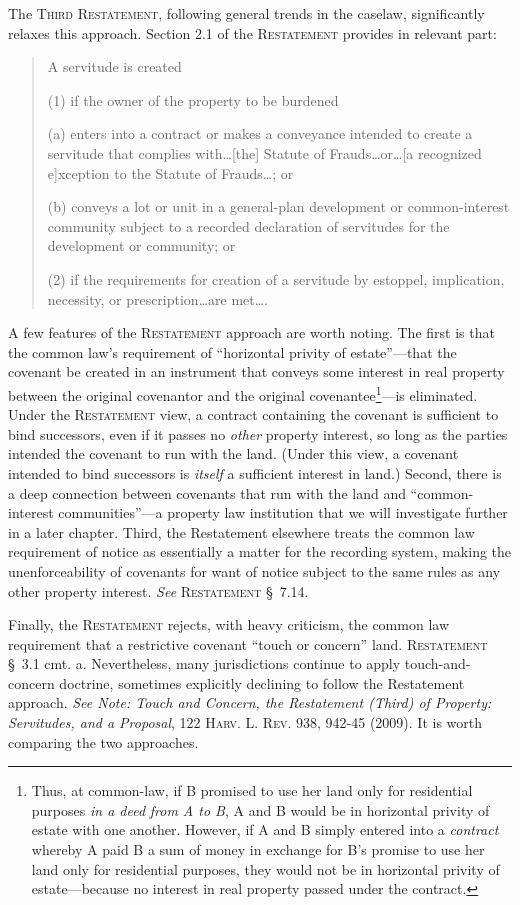 The \textsc{Third Restatement}, following general trends in the caselaw,
significantly relaxes this approach. Section 2.1 of the \textsc{Restatement}
provides in relevant part:
\begin{quotation}
A servitude is created

(1) if the owner of the property to be burdened
\begin{statute}
\item (a) enters into a contract or makes a conveyance intended to create a
servitude that complies with\ldots [the] Statute of Frauds\ldots or\ldots [a
recognized e]xception to the Statute of Frauds\ldots ; or

\item (b) conveys a lot or unit in a general-plan development or common-interest
community subject to a recorded declaration of servitudes for the development or
community; or
\end{statute}
(2) if the requirements for creation of a servitude by estoppel, implication,
necessity, or prescription\ldots are met\ldots .
\end{quotation}
A few features of the \textsc{Restatement} approach are worth noting. The first
is that
the common law's requirement of ``horizontal privity of estate''---that the
covenant be created in an instrument that conveys some interest in real property
between the original covenantor and the original covenantee\footnote{Thus, at
common-law, if B promised to use her land only for residential purposes
\textit{in a deed} \textit{from A to B}, A and B would be in horizontal privity
of estate with one another. However, if A and B simply entered into a
\textit{contract} whereby A paid B a sum of money in exchange for B's promise to
use her land only for residential purposes, they would not be in horizontal
privity of estate---because no interest in real property passed under the
contract.}---is eliminated. Under the \textsc{Restatement} view, a contract
containing
the covenant is sufficient to bind successors, even if it passes no
\textit{other} property interest, so long as the parties intended the covenant
to run with the land. (Under this view, a covenant intended to bind successors
is \textit{itself} a sufficient interest in land.) Second, there is a deep
connection between covenants that run with the land and ``common-interest
communities''---a property law institution that we will investigate further in a
later chapter. Third, the Restatement elsewhere treats the common law
requirement of notice as essentially a matter for the recording system, making
the unenforceability of covenants for want of notice subject to the same rules
as any other property interest. \emph{See} \textsc{Restatement} \S~7.14.

Finally, the \textsc{Restatement} rejects, with heavy criticism, the common law
requirement that a restrictive covenant ``touch or concern'' land.
\textsc{Restatement} \S~3.1 cmt. a. Nevertheless, many jurisdictions continue
to apply touch-and-concern doctrine, sometimes explicitly declining to follow
the Restatement approach. \textit{See Note: Touch and Concern, the Restatement
(Third) of Property: Servitudes, and a Proposal}, 122 \textsc{Harv. L. Rev.}
938, 942-45 (2009). It is worth comparing the two approaches.

